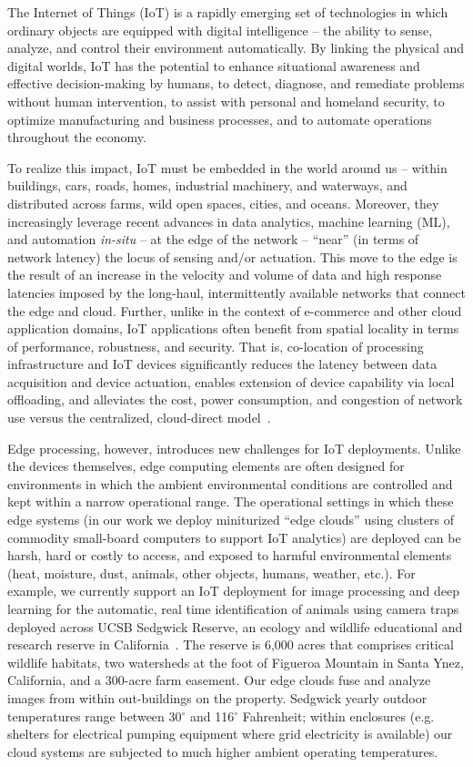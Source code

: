 The Internet of Things (IoT) is a rapidly emerging set of technologies in which ordinary objects are equipped with digital intelligence -- the ability to sense, analyze, and control their environment automatically. By linking the physical and digital worlds, IoT has the potential to enhance situational awareness and effective decision-making by humans, to detect, diagnose, and remediate problems without human intervention, to assist with personal and homeland security, to optimize manufacturing and business processes, and to automate operations throughout the economy.

To realize this impact, IoT must be embedded in the world around us -- within buildings, cars, roads, homes, industrial machinery, and waterways, and distributed across farms, wild open spaces, cities, and oceans. Moreover, they increasingly leverage recent advances in data analytics, machine learning (ML), and automation \textit{in-situ} -- at the edge of the network -- ``near'' (in terms of network latency) the locus of sensing and/or actuation. This move to the edge is the result of an increase in the velocity and volume of data and high response latencies imposed by the long-haul, intermittently available networks that connect the edge and cloud. Further, unlike in the context of e-commerce and other cloud application domains, IoT applications often benefit from spatial locality in terms of performance, robustness, and security. That is, co-location of processing infrastructure and IoT devices significantly reduces the latency between data acquisition and device actuation, enables extension of device capability via local offloading, and alleviates the cost, power consumption, and congestion of network use versus the centralized, cloud-direct model~\cite{edge,bonomi2012fog,cloudlets,cloudlets2012satya,verbelen2012cloudlets}.

Edge processing, however, introduces new challenges for IoT deployments. Unlike the devices themselves, edge computing elements are often designed for environments in which the ambient environmental conditions are controlled and kept within a narrow operational range. The operational settings in which these edge systems (in our work we deploy miniturized ``edge clouds'' using clusters of commodity small-board computers to support IoT analytics) are deployed can be harsh, hard or costly to access, and exposed to harmful environmental elements (heat, moisture, dust, animals, other objects, humans, weather, etc.). For example, we currently support an IoT deployment for image processing and deep learning for the automatic, real time identification of animals using camera traps deployed across UCSB Sedgwick Reserve, an ecology and wildlife educational and research reserve in California~\cite{ref:sedgwick}. The reserve is 6,000 acres that comprises critical wildlife habitats, two watersheds at the foot of Figueroa Mountain in Santa Ynez, California, and a 300-acre farm easement. Our edge clouds fuse and analyze images from within out-buildings on the property. Sedgwick yearly outdoor temperatures range between 30$^{\circ}$ and 116$^{\circ}$ Fahrenheit; within enclosures (e.g. shelters for electrical pumping equipment where grid electricity is available) our cloud systems are subjected to much higher ambient operating temperatures.

